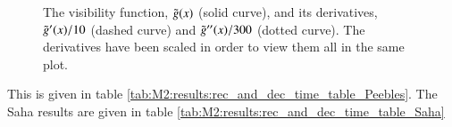 \begin{figure}[ht!]
    \caption{The visibility function, $\tilde{g}(x)$ (solid curve), and its derivatives, $\tilde{g}'(x)/10$ (dashed curve) and $\tilde{g}''(x)/300$ (dotted curve). The derivatives have been scaled in order to view them all in the same plot.}
    \label{fig:M2:results:g_plot}
\end{figure}



This is given in table \ref{tab:M2:results:rec_and_dec_time_table_Peebles}. The Saha results are given in table \ref{tab:M2:results:rec_and_dec_time_table_Saha}